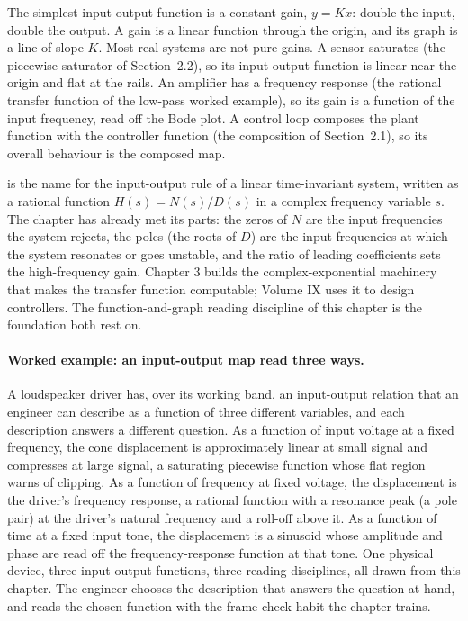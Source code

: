 The simplest input-output function is a constant gain, $y = K x$:
double the input, double the output. A gain is a linear function
through the origin, and its graph is a line of slope $K$. Most real
systems are not pure gains. A sensor saturates (the piecewise
saturator of Section~2.2), so its input-output function is linear
near the origin and flat at the rails. An amplifier has a frequency
response (the rational transfer function of the low-pass worked
example), so its gain is a function of the input frequency, read off
the Bode plot. A control loop composes the plant function with the
controller function (the composition of Section~2.1), so its overall
behaviour is the composed map.

 is the name for the input-output rule of
a linear time-invariant system, written as a rational function
$H(s) = N(s)/D(s)$ in a complex frequency variable $s$. The chapter
has already met its parts: the zeros of $N$ are the input frequencies
the system rejects, the poles (the roots of $D$) are the input
frequencies at which the system resonates or goes unstable, and the
ratio of leading coefficients sets the high-frequency gain. Chapter 3
builds the complex-exponential machinery that makes the transfer
function computable; Volume IX uses it to design controllers. The
function-and-graph reading discipline of this chapter is the
foundation both rest on.

\paragraph{Worked example: an input-output map read three ways.}
A loudspeaker driver has, over its working band, an input-output
relation that an engineer can describe as a function of three
different variables, and each description answers a different
question. As a function of input voltage at a fixed frequency, the
cone displacement is approximately linear at small signal and
compresses at large signal, a saturating piecewise function whose
flat region warns of clipping. As a function of frequency at fixed
voltage, the displacement is the driver's frequency response, a
rational function with a resonance peak (a pole pair) at the driver's
natural frequency and a roll-off above it. As a function of time at a
fixed input tone, the displacement is a sinusoid whose amplitude and
phase are read off the frequency-response function at that tone. One
physical device, three input-output functions, three reading
disciplines, all drawn from this chapter. The engineer chooses the
description that answers the question at hand, and reads the chosen
function with the frame-check habit the chapter trains.

